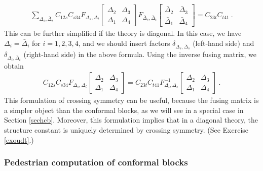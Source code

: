 \documentclass[12pt, a4paper, notitlepage, twoside]{report}
\numberwithin{equation}{section}
\theoremstyle{break}
\begin{document}
\begin{align}
 \sum_{\Delta_s,\bar{\Delta}_s} C_{12s} C_{s34}
F_{\Delta_s,\Delta_t}\begin{bmatrix} \Delta_2 & \Delta_3 \\ \Delta_1 & \Delta_4 \end{bmatrix}
F_{\bar{\Delta}_s,\bar{\Delta}_t}\begin{bmatrix} \bar{\Delta}_2 & \bar{\Delta}_3 \\ \bar{\Delta}_1 & \bar{\Delta}_4 \end{bmatrix}
=  C_{23t}C_{t41}\ .
\end{align}
This can be further simplified if the theory is diagonal.
In this case, we have $\Delta_i=\bar{\Delta}_i$ for $i=1,2,3,4$, and we should insert factors $\delta_{\Delta_s,\bar\Delta_s}$ (left-hand side) and $\delta_{\Delta_t,\bar\Delta_t}$ (right-hand side) in the above formula.
Using the inverse fusing matrix, we obtain 
\begin{align}
 C_{12s} C_{s34}
F_{\Delta_s,\Delta_t}\begin{bmatrix} \Delta_2 & \Delta_3 \\ \Delta_1 & \Delta_4 \end{bmatrix}
= C_{23t}C_{t41} 
F^{-1}_{\Delta_t,\Delta_s}\begin{bmatrix} \Delta_2 & \Delta_3 \\ \Delta_1 & \Delta_4 \end{bmatrix}
\ .
\label{ffm}
\end{align}
This formulation of crossing symmetry can be useful, because the fusing matrix is a simpler object than the conformal blocks, as we will see in a special case in Section \ref{sechcb}. Moreover, this formulation implies that in a diagonal theory, the structure constant is uniquely determined by crossing symmetry. (See Exercise \ref{exoudt}.)


\subsubsection{Pedestrian computation of conformal blocks}
\end{document}

